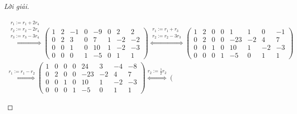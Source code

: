 \documentclass[class=nhvh-linear-algebra,crop=false]{standalone}
\begin{document}
\begin{proof}[Lời giải]
\begin{enumerate}[label = (\alph*)]
\begin{gather*}
                  \stackrel{
                      \substack{
                          r_{1}:= r_{1} + 2r_{4} \\
                          r_{2}:= r_{2} {-} 2r_{4} \\
                          r_{3}:= r_{3} {-} 3r_{4}
                      }
                  }{\Longleftrightarrow}
                  \left(\begin{array}{cccc|cccc}
                          1 & 2 & -1 & 0 & -9 & 0 & 2  & 2  \\
                          0 & 2 & 3  & 0 & 7  & 1 & -2 & -2 \\
                          0 & 0 & 1  & 0 & 10 & 1 & -2 & -3 \\
                          0 & 0 & 0  & 1 & -5 & 0 & 1  & 1
                      \end{array}
                  \right)
                  \stackrel{
                      \substack{
                          r_{1}:= r_{1} + r_{3} \\
                          r_{2}:= r_{2} {-} 3r_{3}
                      }
                  }{\Longleftrightarrow}
                  \left(\begin{array}{cccc|cccc}
                          1 & 2 & 0 & 0 & 1   & 1  & 0  & -1 \\
                          0 & 2 & 0 & 0 & -23 & -2 & 4  & 7  \\
                          0 & 0 & 1 & 0 & 10  & 1  & -2 & -3 \\
                          0 & 0 & 0 & 1 & -5  & 0  & 1  & 1
                      \end{array}
                  \right) \\
                  \stackrel{
                      r_{1}:= r_{1} {-} r_{2}
                  }{\Longleftrightarrow}
                  \left(\begin{array}{cccc|cccc}
                          1 & 0 & 0 & 0 & 24  & 3  & -4 & -8 \\
                          0 & 2 & 0 & 0 & -23 & -2 & 4  & 7  \\
                          0 & 0 & 1 & 0 & 10  & 1  & -2 & -3 \\
                          0 & 0 & 0 & 1 & -5  & 0  & 1  & 1
                      \end{array}
                  \right)
                  \stackrel{
                  r_{2}:= \frac{1}{2}r_{2}
                  }{\Longleftrightarrow}
                  \left(\begin{array}{cccc|cccc}

\end{array}
\end{gather*}
\end{enumerate}
\end{proof}
\end{document}
